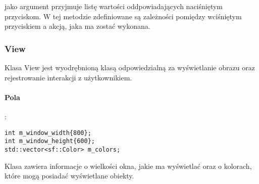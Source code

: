 \documentclass[11pt, a4paper]{article}
\begin{document}
jako argument przyjmuje listę wartości oddpowiadających naciśniętym przyciskom. W tej metodzie zdefiniowane są zależności 
pomiędzy wciśniętym przyciskiem a akcją, jaka ma zostać wykonana.
\subsubsection{View}
Klasa View jest wyodrębnioną klasą odpowiedzialną za wyświetlanie obrazu oraz rejestrowanie interakcji z użytkownikiem.
\paragraph{Pola}: 
\begin{lstlisting}
int m_window_width{800};
int m_window_height{600};
std::vector<sf::Color> m_colors;
\end{lstlisting}
Klasa zawiera informacje o wielkości okna, jakie ma wyświetlać oraz o kolorach, które mogą posiadać wyświetlane obiekty.
\end{document}
